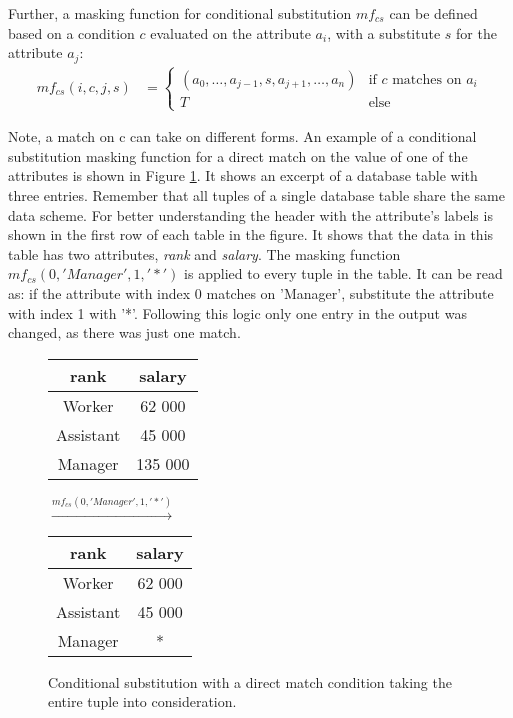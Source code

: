 Further, a masking function for conditional substitution $mf_{cs}$ can be defined based on a condition $c$ evaluated on the attribute $a_i$, with a substitute $s$ for the attribute $a_j$:
\vspace{-0.8em}
\[
\begin{aligned}
mf_{cs}(i, c, j, s) &= 
\begin{cases}
    (a_0, \dots, a_{j-1}, s, a_{j+1}, \dots, a_n) & \text{if } c \text{ matches on } a_i \\
    T & \text{else}
\end{cases}
\end{aligned}
\]

Note, a match on c can take on different forms. An example of a conditional substitution masking function for a direct match on the value of one of the attributes is shown in Figure \ref{fig:condiSubValue}. It shows an excerpt of a database table with three entries. Remember that all tuples of a single database table share the same data scheme. For better understanding the header with the attribute's labels is shown in the first row of each table in the figure. It shows that the data in this table has two attributes, \textit{rank} and \textit{salary}. The masking function $mf_{cs}(0, 'Manager', 1, '*')$ is applied to every tuple in the table. It can be read as: if the attribute with index 0 matches on 'Manager', substitute the attribute with index 1 with '*'. Following this logic only one entry in the output was changed, as there was just one match.

\bigskip

\begin{figure}[ht]
    \begin{center}
    \footnotesize{
        \renewcommand{\arraystretch}{1.5}
        \begin{tabular}{|c|c|}
            \hline
            rank & salary\\
            \hline
            Worker & 62 000 \\
            \hline
            Assistant & 45 000 \\
            \hline
            Manager & 135 000 \\
            \hline
        \end{tabular}
        \quad $\xrightarrow{mf_{cs}(0, 'Manager', 1, '*')}$ \quad
        \begin{tabular}{|c|c|}
            \hline
            rank & salary\\
            \hline
            Worker & 62 000 \\
            \hline
            Assistant & 45 000 \\
            \hline
            Manager & * \\
            \hline
        \end{tabular}
    }
    \end{center}
    \caption{Conditional substitution with a direct match condition taking the entire tuple into consideration.\label{fig:condiSubValue}}
\end{figure}

